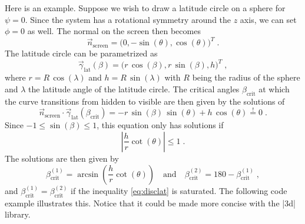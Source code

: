 \documentclass[a4paper,fleqn]{ltxdoc}
\begin{document}
Here is an example. Suppose we wish to draw a latitude circle on a sphere for
$\psi=0$. Since the system has a rotational symmetry around the $z$ axis, we can
set $\phi=0$ as well. The normal on the screen then becomes
\[
 \vec n_\mathrm{screen}=
 \bigl(0,-\sin(\theta),\cos(\theta)\bigr)^T\;.
\]
The latitude circle can be parametrized as
\[
 \vec\gamma_\mathrm{lat}(\beta)=
 \bigl(r\,\cos(\beta),r\,\sin(\beta),h\bigr)^T\;,
\]
where $r=R\,\cos(\lambda)$ and $h=R\,\sin(\lambda)$ with $R$ being the radius of
the sphere and $\lambda$ the latitude angle of the latitude circle. The critical
angles $\beta_\mathrm{crit}$ at which the curve transitions from hidden to
visible are then given by the solutions of
\[
 \vec n_\mathrm{screen}\cdot\vec\gamma_\mathrm{lat}(\beta_\mathrm{crit})
 =-r\,\sin(\beta)\,\sin(\theta)+h\,\cos(\theta)
 \overset{!}{=}0\;.
\]
Since $-1\le\sin(\beta)\le1$, this equation only has solutions if 
\begin{equation}\label{eq:disclat}
 \left\vert\frac{h}{r}\cot(\theta)\right\vert\le1\;.
\end{equation} 
The solutions are then given by 
\[
 \beta_\mathrm{crit}^{(1)}=\arcsin\left(\frac{h}{r}\cot(\theta)\right)
 \quad\text{and}\quad
 \beta_\mathrm{crit}^{(2)}=180-\beta_\mathrm{crit}^{(1)}\;,
\]
and $\beta_\mathrm{crit}^{(1)}=\beta_\mathrm{crit}^{(2)}$ if the inequality 
\eqref{eq:disclat} is saturated. The following code example illustrates this.
Notice that it could be made more concise with the |3d| library.

\begin{codeexample}[width=5.6cm,preamble={\usetikzlibrary{3dtools}}]
\end{codeexample}
\end{document}
